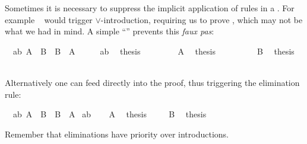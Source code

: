 \begin{isabellebody}
\begin{isamarkuptext}
Sometimes it is necessary to suppress the implicit application of rules in a
. For example ~
would trigger $\lor$-introduction, requiring us to prove , which may
not be what we had in mind.
A simple ``\isa{{\isacharminus}}'' prevents this \emph{faux pas}:%
\end{isamarkuptext}%
\isamarkuptrue%
\isamarkupfalse%
\ \ ab{\isacharcolon}\ {\isachardoublequoteopen}A\ {\isasymor}\ B{\isachardoublequoteclose}\ \ {\isachardoublequoteopen}B\ {\isasymor}\ A{\isachardoublequoteclose}\isanewline
%
\isadelimproof
%
\endisadelimproof
%
\isatagproof
{}\isamarkupfalse%
\ {\isacharminus}\isanewline
\ \ \isamarkupfalse%
\ ab\ \isamarkupfalse%
\ {\isacharquery}thesis\isanewline
\ \ \isamarkupfalse%
\isanewline
\ \ \ \ \isamarkupfalse%
\ A\ \isamarkupfalse%
\ {\isacharquery}thesis\ \isacommand{{\isachardot}{\isachardot}}\isamarkupfalse%
\isanewline
\ \ \isamarkupfalse%
\isanewline
\ \ \ \ \isamarkupfalse%
\ B\ \isamarkupfalse%
\ {\isacharquery}thesis\ \isacommand{{\isachardot}{\isachardot}}\isamarkupfalse%
\isanewline
\ \ \isamarkupfalse%
\isanewline
{}\isamarkupfalse%
%
\endisatagproof
{\isafoldproof}%
%
\isadelimproof
%
\endisadelimproof
%
\begin{isamarkuptext}%
\noindent Alternatively one can feed  directly
into the proof, thus triggering the elimination rule:%
\end{isamarkuptext}%
\isamarkuptrue%
\isamarkupfalse%
\ \ ab{\isacharcolon}\ {\isachardoublequoteopen}A\ {\isasymor}\ B{\isachardoublequoteclose}\ \ {\isachardoublequoteopen}B\ {\isasymor}\ A{\isachardoublequoteclose}\isanewline
%
\isadelimproof
%
\endisadelimproof
%
\isatagproof
{}\isamarkupfalse%
\ ab\isanewline
{}\isamarkupfalse%
\isanewline
\ \ \isamarkupfalse%
\ A\ \isamarkupfalse%
\ {\isacharquery}thesis\ \isacommand{{\isachardot}{\isachardot}}\isamarkupfalse%
\isanewline
{}\isamarkupfalse%
\isanewline
\ \ \isamarkupfalse%
\ B\ \isamarkupfalse%
\ {\isacharquery}thesis\ \isacommand{{\isachardot}{\isachardot}}\isamarkupfalse%
\isanewline
{}\isamarkupfalse%
%
\endisatagproof
{\isafoldproof}%
%
\isadelimproof
%
\endisadelimproof
%
\begin{isamarkuptext}%
\noindent Remember that eliminations have priority over
introductions.


\end{isamarkuptext}
\end{isabellebody}

